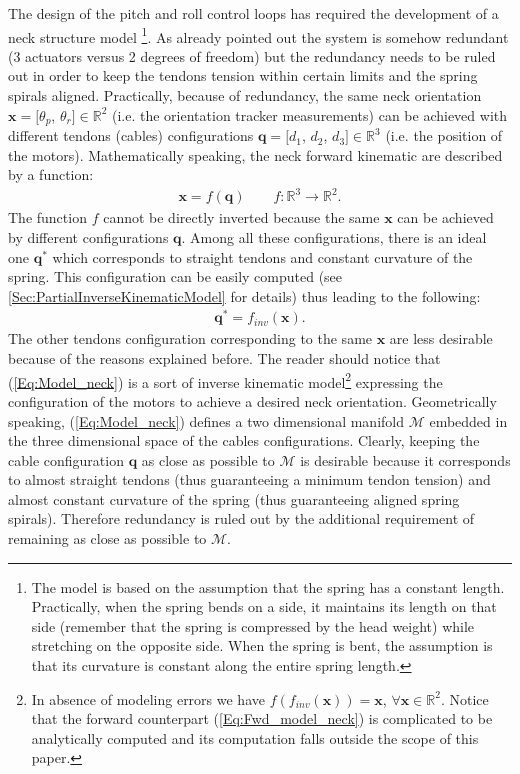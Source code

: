 \documentclass[conference]{IEEEtran}
\numberwithin{equation}{section}
\newcommand{\q}{\mathbf{q}}
\newcommand{\x}{\mathbf{x}}
\begin{document}
The design of the pitch and roll control loops has required the development of a neck structure model \footnote{The model is based on the assumption that the spring has a constant length. Practically, when the spring bends on a side, it maintains its length on that side (remember that the spring is compressed by the head weight) while stretching on the opposite side. When the spring is bent, the assumption is that its curvature is constant along the entire spring length.}.
As already pointed out the system is somehow redundant (3 actuators versus 2 degrees of freedom) but the redundancy needs to be ruled out in order to keep the tendons tension within certain limits and the spring spirals aligned. Practically, because of redundancy, the same neck orientation $\x = [\theta_p$, $\theta_r] \in \mathbb R^2$ (i.e. the orientation tracker measurements) can be achieved with different tendons (cables) configurations $\q = [d_1$, $d_2$, $d_3] \in \mathbb R^3$ (i.e. the position of the motors). Mathematically speaking, the neck forward kinematic are described by a function:
\begin{eqnarray} \label{Eq:Fwd_model_neck}
\x = f (\q) \qquad f:\mathbb{R}^3 \rightarrow \mathbb{R}^2.
\end{eqnarray}
The function $f$ cannot be directly inverted because the same $\x$ can be achieved by different configurations $\q$. Among all these configurations, there is an ideal one $\q^*$ which corresponds to straight tendons and constant curvature of the spring. This configuration can be easily computed (see \ref{Sec:PartialInverseKinematicModel} for details) thus leading to the following:
\begin{eqnarray} \label{Eq:Model_neck}
\q^* = f_{inv} (\x).
\end{eqnarray}
The other tendons configuration corresponding to the same $\x$ are less desirable because of the reasons explained before. The reader should notice that (\ref{Eq:Model_neck}) is a sort of inverse kinematic model\footnote{In absence of modeling errors we have $f(f_{inv}(\x)) = \x$, $\forall \x \in \mathbb R^2$. Notice that the forward counterpart (\ref{Eq:Fwd_model_neck}) is  complicated to be analytically computed and its computation falls outside the scope of this paper.} expressing the configuration of the motors to achieve a desired neck orientation. Geometrically speaking, (\ref{Eq:Model_neck}) defines a two dimensional manifold $\mathcal M$ embedded in the three dimensional space of the cables configurations.
Clearly, keeping the cable configuration $\q$ as close as possible to $\mathcal M$ is desirable because it corresponds to almost straight tendons (thus guaranteeing a minimum tendon tension) and almost constant curvature of the spring (thus guaranteeing aligned spring spirals). Therefore redundancy is ruled out by the additional requirement of remaining as close as possible to $\mathcal M$.
\end{document}
